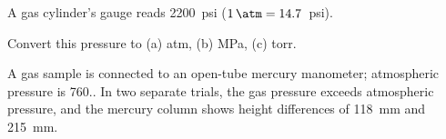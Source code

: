 \documentclass{apchem-exam}
\begin{document}
\begin{rubric}
\end{rubric}

\clearpage
{}


A gas cylinder's gauge reads 2200~psi ($\SI{1}{\atm}=14.7$~psi).

Convert this pressure to (a) atm, (b) MPa, (c) torr.
\workspace[4cm]

\begin{rubric}
\end{rubric}


A gas sample is connected to an open-tube mercury manometer; atmospheric
pressure is \SI{760.}{\torr}. In two separate trials, the gas pressure
exceeds atmospheric pressure, and the mercury column shows height
differences of \SI{118}{\milli\meter} and \SI{215}{\milli\meter}.
\end{document}
